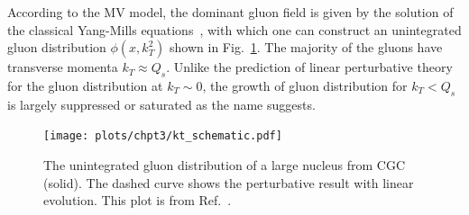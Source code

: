 According to the MV model, the dominant gluon field is given by the solution of
the classical Yang-Mills equations~\cite{Kovchegov:1996ty}, with
which one can construct an unintegrated gluon distribution $\phi(x,k^{2}_{T})$
shown in Fig.~\ref{fig:gluon_TMD}. The majority of the gluons have transverse
momenta $k_{T}\approx Q_{s}$. Unlike the prediction of linear perturbative
theory for the gluon distribution at $k_{T}\sim0$, the growth of gluon distribution
for $k_{T}<Q_{s}$ is largely suppressed or saturated as the name suggests.
\begin{figure}
\centering
\texttt{[image: plots/chpt3/kt\_schematic.pdf]}
\caption[Unintegrated gluon transverse momentum distribution]{
The unintegrated gluon distribution of a large nucleus from CGC (solid). The dashed curve 
shows the perturbative result with linear evolution. This plot is from Ref.~\cite{Accardi:2012qut}.}
\label{fig:gluon_TMD}
\end{figure}


